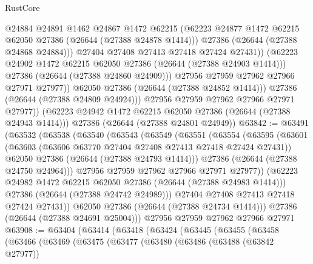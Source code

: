 \begin{lexlean}{RustCore}
\begin{coremodule}
                        @24884
                        @24891
                        @1462
                        @24867
                        @1472
                        @62215
                        (@62223 @24877 @1472 @62215 @62050 @27386 (@26644 (@27388 @24878 @1414)))
                        @27386
                        (@26644 (@27388 @24868 @24884)))
                      @27404
                      @27408
                      @27413
                      @27418
                      @27424
                      @27431))
                  (@62223 @24902 @1472 @62215 @62050 @27386 (@26644 (@27388 @24903 @1414)))
                  @27386
                  (@26644 (@27388 @24860 @24909)))
                @27956
                @27959
                @27962
                @27966
                @27971
                @27977))
            @62050
            @27386
            (@26644 (@27388 @24852 @1414)))
          @27386
          (@26644 (@27388 @24809 @24924)))
        @27956
        @27959
        @27962
        @27966
        @27971
        @27977))
    (@62223 @24942 @1472 @62215 @62050 @27386 (@26644 (@27388 @24943 @1414)))
    @27386
    (@26644 (@27388 @24801 @24949))
@63842 := @63491
    (@63532
      (@63538
        (@63540
          (@63543
            (@63549
              (@63551
                (@63554
                  (@63595
                    (@63601
                      (@63603 (@63606 @63770 @27404 @27408 @27413 @27418 @27424 @27431))
                      @62050
                      @27386
                      (@26644 (@27388 @24793 @1414)))
                    @27386
                    (@26644 (@27388 @24750 @24964)))
                  @27956
                  @27959
                  @27962
                  @27966
                  @27971
                  @27977))
              (@62223 @24982 @1472 @62215 @62050 @27386 (@26644 (@27388 @24983 @1414)))
              @27386
              (@26644 (@27388 @24742 @24989)))
            @27404
            @27408
            @27413
            @27418
            @27424
            @27431))
        @62050
        @27386
        (@26644 (@27388 @24734 @1414)))
      @27386
      (@26644 (@27388 @24691 @25004)))
    @27956
    @27959
    @27962
    @27966
    @27971
@63908 := @63404
    (@63414
      (@63418
        (@63424
          (@63445
            (@63455
              (@63458
                (@63466
                  (@63469
                    (@63475
                      (@63477
                        (@63480
                          (@63486
                            (@63488 (@63842 @27977))

\end{coremodule}
\end{lexlean}
